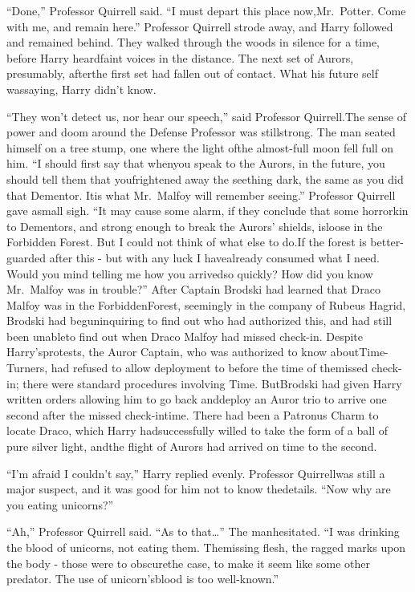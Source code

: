 ``Done,'' Professor Quirrell said. ``I must depart this place now,Mr.~Potter. Come with me, and remain here.''
Professor Quirrell strode away, and Harry followed and remained behind.
They walked through the woods in silence for a time, before Harry heardfaint voices in the distance. The next set of Aurors, presumably, afterthe first set had fallen out of contact. What his future self wassaying, Harry didn't know.

``They won't detect us, nor hear our speech,'' said Professor Quirrell.The sense of power and doom around the Defense Professor was stillstrong. The man seated himself on a tree stump, one where the light ofthe almost-full moon fell full on him. ``I should first say that whenyou speak to the Aurors, in the future, you should tell them that youfrightened away the seething dark, the same as you did that Dementor. Itis what Mr.~Malfoy will remember seeing.'' Professor Quirrell gave asmall sigh. ``It may cause some alarm, if they conclude that some horrorkin to Dementors, and strong enough to break the Aurors' shields, isloose in the Forbidden Forest. But I could not think of what else to do.If the forest is better-guarded after this - but with any luck I havealready consumed what I need. Would you mind telling me how you arrivedso quickly? How did you know Mr.~Malfoy was in trouble?''
After Captain Brodski had learned that Draco Malfoy was in the ForbiddenForest, seemingly in the company of Rubeus Hagrid, Brodski had beguninquiring to find out who had authorized this, and had still been unableto find out when Draco Malfoy had missed check-in. Despite Harry'sprotests, the Auror Captain, who was authorized to know aboutTime-Turners, had refused to allow deployment to before the time of themissed check-in; there were standard procedures involving Time. ButBrodski had given Harry written orders allowing him to go back anddeploy an Auror trio to arrive one second after the missed check-intime. There had been a Patronus Charm to locate Draco, which Harry hadsuccessfully willed to take the form of a ball of pure silver light, andthe flight of Aurors had arrived on time to the second.

``I'm afraid I couldn't say,'' Harry replied evenly. Professor Quirrellwas still a major suspect, and it was good for him not to know thedetails. ``Now why are you eating unicorns?''

``Ah,'' Professor Quirrell said. ``As to that\ldots{}'' The manhesitated. ``I was drinking the blood of unicorns, not eating them. Themissing flesh, the ragged marks upon the body - those were to obscurethe case, to make it seem like some other predator. The use of unicorn'sblood is too well-known.''

